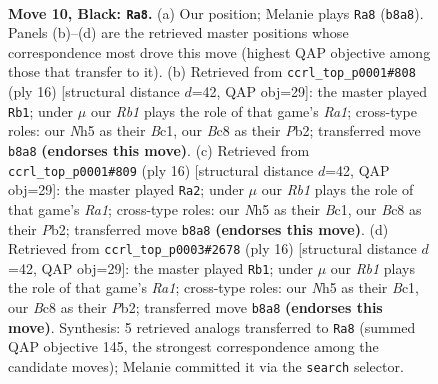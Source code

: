 \documentclass[11pt]{article}
\begin{document}
\clearpage

\begin{figure}[p]\centering
\begin{subfigure}{0.46\textwidth}\centering
\resizebox{\linewidth}{!}{%
\newchessgame
\chessboard[
  setfen={1rbq1rk1/pp1p1pbp/2n3p1/2p1p2n/2P4P/4PNP1/PP1P1PB1/RNBQR1K1 b - - 1 10},
  showmover=false,
  pgfstyle=straightmove, color=movearrow, markmove={b8-a8}
]}
\caption{}
\end{subfigure}\hfill
\begin{subfigure}{0.46\textwidth}\centering
\resizebox{\linewidth}{!}{%
\newchessgame
\chessboard[
  setfen={r1bqr1k1/ppp2pbp/2nppnp1/8/2PP4/P1N2NP1/1P2PPBP/R1BQ1RK1 w - - 5 9},
  showmover=false,
  pgfstyle=straightmove, color=movearrow, markmove={a1-b1}
]}
\caption{}
\end{subfigure}
\\[4pt]
\begin{subfigure}{0.46\textwidth}\centering
\resizebox{\linewidth}{!}{%
\newchessgame
\chessboard[
  setfen={r1bqr1k1/ppp2pbp/2nppnp1/8/2PP4/P1N2NP1/1P2PPBP/R1BQ1RK1 w - - 5 9},
  showmover=false,
  pgfstyle=straightmove, color=movearrow, markmove={a1-a2}
]}
\caption{}
\end{subfigure}\hfill
\begin{subfigure}{0.46\textwidth}\centering
\resizebox{\linewidth}{!}{%
\newchessgame
\chessboard[
  setfen={r1bqr1k1/ppp2pbp/2nppnp1/8/2PP4/P1N2NP1/1P2PPBP/R1BQ1RK1 w - - 5 9},
  showmover=false,
  pgfstyle=straightmove, color=movearrow, markmove={a1-b1}
]}
\caption{}
\end{subfigure}
\caption{\textbf{Move 10, Black: \texttt{Ra8}.} (a) Our position; Melanie plays \texttt{Ra8} (\texttt{b8a8}). Panels (b)--(d) are the retrieved master positions whose correspondence most drove this move (highest QAP objective among those that transfer to it). (b) Retrieved from \texttt{ccrl\_top\_p0001\#808} (ply 16) [structural distance $d$=42, QAP obj=29]: the master played \texttt{Rb1}; under $\mu$ our \emph{Rb1} plays the role of that game's \emph{Ra1}; cross-type roles: our \emph{N}h5 as their \emph{B}c1, our \emph{B}c8 as their \emph{P}b2; transferred move \texttt{b8a8} \textbf{(endorses this move)}. (c) Retrieved from \texttt{ccrl\_top\_p0001\#809} (ply 16) [structural distance $d$=42, QAP obj=29]: the master played \texttt{Ra2}; under $\mu$ our \emph{Rb1} plays the role of that game's \emph{Ra1}; cross-type roles: our \emph{N}h5 as their \emph{B}c1, our \emph{B}c8 as their \emph{P}b2; transferred move \texttt{b8a8} \textbf{(endorses this move)}. (d) Retrieved from \texttt{ccrl\_top\_p0003\#2678} (ply 16) [structural distance $d$=42, QAP obj=29]: the master played \texttt{Rb1}; under $\mu$ our \emph{Rb1} plays the role of that game's \emph{Ra1}; cross-type roles: our \emph{N}h5 as their \emph{B}c1, our \emph{B}c8 as their \emph{P}b2; transferred move \texttt{b8a8} \textbf{(endorses this move)}. Synthesis: 5 retrieved analogs transferred to \texttt{Ra8} (summed QAP objective 145, the strongest correspondence among the candidate moves); Melanie committed it via the \texttt{search} selector.}
\label{fig:thought-m19}
\end{figure}
\end{document}
